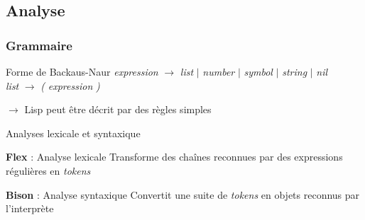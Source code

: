 \documentclass[info]{ensrennesbeamer}
\begin{document}
\subsection{Analyse}
\begin{frame}
\frametitle{Grammaire}
	\begin{block}{Forme de Backaus-Naur}
		\emph{expression} $\rightarrow$ \emph{list} $\vert$ \emph{number} $\vert$ \emph{symbol} $\vert$ \emph{string} $\vert$ \emph{nil} \\
		\emph{list} $\rightarrow$ \emph{(} \emph{expression} \emph{)}
	\end{block}
	$\rightarrow$ Lisp peut être décrit par des règles simples
\end{frame}

\begin{frame}{Analyses lexicale et syntaxique}

\begin{block}{\textbf{Flex} : Analyse lexicale}
	Transforme des chaînes reconnues par des expressions régulières en \emph{tokens}
\end{block}

\begin{block}{\textbf{Bison} : Analyse syntaxique}
	Convertit une suite de \emph{tokens} en objets reconnus par l'interprète
\end{block}
\end{frame}
\end{document}
